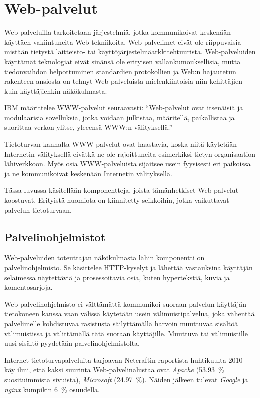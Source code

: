 
\chapter{Web-palvelut}

Web-palveluilla tarkoitetaan järjestelmiä, jotka kommunikoivat
keskenään käyttäen vakiintuneita Web-tekniikoita. Web-palvelimet eivät
ole riippuvaisia mistään tietystä laitteisto- tai
käyttöjärjestelmäarkkitehtuurista. Web-palveluiden käyttämät
teknologiat eivät sinänsä ole erityisen vallankumouksellisia, mutta
tiedonvaihdon helpottuminen standardien protokollien ja Web:n
hajautetun rakenteen ansiosta on tehnyt Web-palveluista
mielenkiintoisia niin kehittäjien kuin käyttäjienkin
näkökulmasta\cite{javaweb}.

IBM määrittelee WWW-palvelut seuraavasti: ``Web-palvelut ovat
itsenäisiä ja modulaarisia sovelluksia, jotka voidaan julkistaa,
määritellä, paikallistaa ja suorittaa verkon ylitse, yleeensä WWW:n
välityksellä.''\cite[s.4]{websecurity}

Tietoturvan kannalta WWW-palvelut ovat haastavia, koska niitä
käytetään Internetin välityksellä eivätkä ne ole rajoittuneita
esimerkiksi tietyn organisaation lähiverkkoon. Myös osia
WWW-palveluista sijaitsee usein fyysisesti eri paikoissa ja ne
kommunikoivat keskenään Internetin välityksellä.

Tässa luvussa käsitellään komponentteja, joista tämänhetkiset
Web-palvelut koostuvat. Erityistä huomiota on kiinnitetty seikkoihin,
jotka vaikuttavat palvelun tietoturvaan.

\section{Palvelinohjelmistot}

Web-palveluiden toteuttajan näkökulmasta lähin komponentti on
palvelinohjelmisto. Se käsittelee HTTP-kyselyt ja lähettää vastauksina
käyttäjän selaimessa näytettäviä ja prosessoitavia osia, kuten
hypertekstiä, kuvia ja komentosarjoja.

Web-palvelinohjelmisto ei välttämättä kommunikoi suoraan palvelun
käyttäjän tietokoneen kanssa vaan välissä käytetään usein välimuistipalvelua,
joka vähentää palvelimelle kohdistuvaa rasistusta säilyttämällä
harvoin muuttuvaa sisältöä välimuistissa ja välittämällä tätä suoraan
käyttäjille. Muuttuva tai välimuistille uusi sisältö pyydetään
palvelinohjelmistolta.

Internet-tietoturvapalveluita tarjoavan Netcraftin raportista
huhtikuulta 2010~\cite{netcraft} käy ilmi, että kaksi suurinta
Web-palvelinalustaa ovat \textit{Apache} (53.93~\% suosituimmista
sivuista), \textit{Microsoft} (24.97~\%). Näiden jälkeen tulevat
\textit{Google} ja \textit{nginx} kumpikin 6~\% osuudella.

